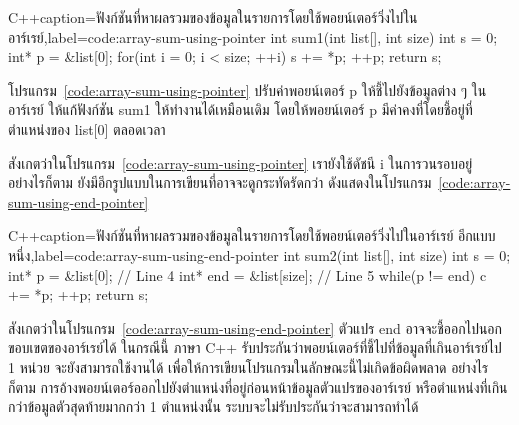 \latintext
\begin{codelist}{C++}{caption={\thaitext ฟังก์ชัน{\wbr}ที่{\wbr}หา{\wbr}ผลรวม{\wbr}ของ{\wbr}ข้อมูล{\wbr}ใน{\wbr}รายการ{\wbr}โดย{\wbr}ใช้{\wbr}พอยน์เตอร์{\wbr}วิ่ง{\wbr}ไป{\wbr}ใน{\wbr}อาร์เรย์\latintext},label=code:array-sum-using-pointer}
int sum1(int list[], int size)            
{
  int s = 0;
  int* p = &list[0];
  for(int i = 0; i < size; ++i) {
    s += *p;
    ++p;
  }
  return s;
}
\end{codelist}
\thaitext

\begin{quiz}{}
โปรแกรม~\ref{code:array-sum-using-pointer} ปรับ{\wbr}ค่า{\wbr}พอยน์เตอร์ {\ct p}
ให้{\wbr}ชี้{\wbr}ไป{\wbr}ยัง{\wbr}ข้อมูล{\wbr}ต่าง ๆ ใน{\wbr}อาร์เรย์ ให้{\wbr}แก้{\wbr}ฟังก์ชัน {\ct sum1} ให้{\wbr}ทำงาน{\wbr}ได้{\wbr}เหมือน{\wbr}เดิม{\wbr}
โดย{\wbr}ให้{\wbr}พอยน์เตอร์ {\ct p} มี{\wbr}ค่าคงที่{\wbr}โดย{\wbr}ชี้{\wbr}อยู่{\wbr}ที่{\wbr}ตำแหน่ง{\wbr}ของ {\ct list[0]} ตลอดเวลา{\wbr}
\end{quiz}

สังเกต{\wbr}ว่า{\wbr}ใน{\wbr}โปรแกรม~\ref{code:array-sum-using-pointer} เรา{\wbr}ยัง{\wbr}ใช้{\wbr}ดัชนี {\ct i}
ใน{\wbr}การ{\wbr}วน{\wbr}รอบ{\wbr}อยู่ อย่างไรก็ตาม ยัง{\wbr}มี{\wbr}อีก{\wbr}รูปแบบ{\wbr}ใน{\wbr}การ{\wbr}เขียน{\wbr}ที่{\wbr}อาจ{\wbr}จะ{\wbr}ดู{\wbr}กระ{\wbr}ทัด{\wbr}รัด{\wbr}กว่า{\wbr}
ดัง{\wbr}แสดง{\wbr}ใน{\wbr}โปรแกรม~\ref{code:array-sum-using-end-pointer}

\latintext
\begin{codelist}{C++}{caption={\thaitext ฟังก์ชัน{\wbr}ที่{\wbr}หา{\wbr}ผลรวม{\wbr}ของ{\wbr}ข้อมูล{\wbr}ใน{\wbr}รายการ{\wbr}โดย{\wbr}ใช้{\wbr}พอยน์เตอร์{\wbr}วิ่ง{\wbr}ไป{\wbr}ใน{\wbr}อาร์เรย์ อีก{\wbr}แบบ{\wbr}หนึ่ง\latintext},label=code:array-sum-using-end-pointer}
int sum2(int list[], int size)
{
  int s = 0;
  int* p = &list[0];             // Line 4
  int* end = &list[size];        // Line 5
  while(p != end) {
    c += *p;
    ++p;
  }
  return s;
}
\end{codelist}
\thaitext

สังเกต{\wbr}ว่า{\wbr}ใน{\wbr}โปรแกรม~\ref{code:array-sum-using-end-pointer} ตัวแปร {\ct
  end} อาจ{\wbr}จะ{\wbr}ชี้{\wbr}ออก{\wbr}ไป{\wbr}นอก{\wbr}ขอบเขต{\wbr}ของ{\wbr}อาร์เรย์{\wbr}ได้ ใน{\wbr}กรณี{\wbr}นี้ ภาษา C++
รับประกัน{\wbr}ว่า{\wbr}พอยน์เตอร์{\wbr}ที่{\wbr}ชี้{\wbr}ไป{\wbr}ที่{\wbr}ข้อมูล{\wbr}ที่{\wbr}เกิน{\wbr}อาร์เรย์{\wbr}ไป 1 หน่วย จะ{\wbr}ยัง{\wbr}สามารถ{\wbr}ใช้{\wbr}งาน{\wbr}ได้{\wbr}
เพื่อให้{\wbr}การ{\wbr}เขียน{\wbr}โปรแกรม{\wbr}ใน{\wbr}ลักษณะ{\wbr}นี้{\wbr}ไม่{\wbr}เกิด{\wbr}ข้อผิดพลาด อย่างไรก็ตาม{\wbr}
การ{\wbr}อ้าง{\wbr}พอยน์เตอร์{\wbr}ออก{\wbr}ไป{\wbr}ยัง{\wbr}ตำแหน่ง{\wbr}ที่อยู่{\wbr}ก่อนหน้า{\wbr}ข้อมูล{\wbr}ตัวแปร{\wbr}ของ{\wbr}อาร์เรย์
หรือ{\wbr}ตำแหน่ง{\wbr}ที่{\wbr}เกิน{\wbr}กว่า{\wbr}ข้อมูล{\wbr}ตัว{\wbr}สุดท้าย{\wbr}มาก{\wbr}กว่า 1 ตำแหน่ง{\wbr}นั้น{\wbr}
ระบบ{\wbr}จะ{\wbr}ไม่{\wbr}รับประกัน{\wbr}ว่า{\wbr}จะ{\wbr}สามารถ{\wbr}ทำ{\wbr}ได้{\wbr}

